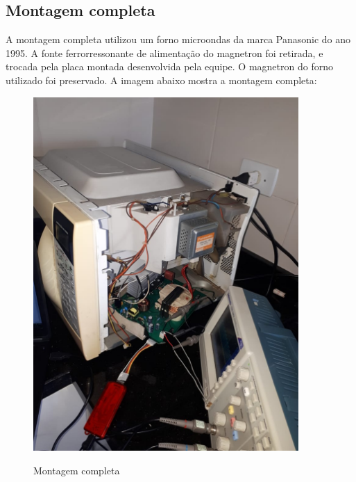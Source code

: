 \subsection{Montagem completa}
A montagem completa utilizou um forno microondas da marca Panasonic do ano 1995. A fonte ferrorressonante de alimentação do magnetron foi retirada, e trocada pela placa montada desenvolvida pela equipe. O magnetron do forno utilizado foi preservado. A imagem abaixo mostra a montagem completa:
\begin{figure}[H]
    \centering
    \caption{Montagem completa}
    \includegraphics[width=0.9\textwidth]{./dados/figuras/montagem-full}
    \label{fig:figura-montagem-shunt-uc}
\end{figure}

